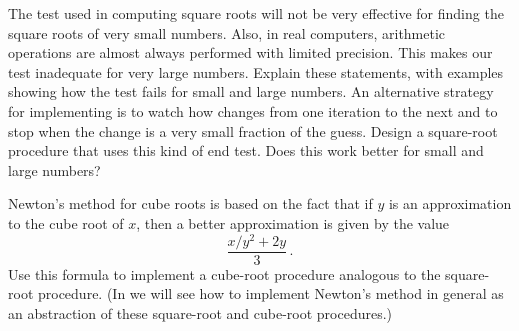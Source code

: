 \begin{exercise}
	\label{Exercise 1.7}
	The  test used in computing square roots will not be very effective for finding the square roots of very small numbers.
	Also, in real computers, arithmetic operations are almost always performed with limited precision.
	This makes our test inadequate for very large numbers.
	Explain these statements, with examples showing how the test fails for small and large numbers.
	An alternative strategy for implementing  is to watch how  changes from one iteration to the next and to stop when the change is a very small fraction of the guess.
	Design a square-root procedure that uses this kind of end test.
	Does this work better for small and large numbers?
\end{exercise}



\begin{exercise}
	\label{Exercise 1.8}
	Newton’s method for cube roots is based on the fact that if \( y \) is an approximation to the cube root of \( x \), then a better approximation is given by the value
	\[
		\frac{x / y^2 + 2y}{3} \,.
	\]
	Use this formula to implement a cube-root procedure analogous to the square-root procedure.
	(In  we will see how to implement Newton’s method in general as an abstraction of these square-root and cube-root procedures.)
\end{exercise}
